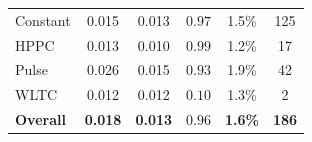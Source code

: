 \begin{table}
\begin{center}
\begin{tabular}{lccccc}
			Constant              & 0.015          & 0.013          & $0.97$                        & 1.5\%          & 125             \\
			HPPC                  & 0.013          & 0.010          & $0.99$                        & 1.2\%          & 17              \\
			Pulse                 & 0.026          & 0.015          & $0.93$                        & 1.9\%          & 42              \\
			WLTC                  & 0.012          & 0.012          & $0.10$                        & 1.3\%          & 2               \\
			\hline
			\textbf{Overall}      & \textbf{0.018} & \textbf{0.013} & $\mathbf{0.96}$               & \textbf{1.6\%} & \textbf{186}    \\
			\hline
		\end{tabular}
	\end{center}
\end{table}
